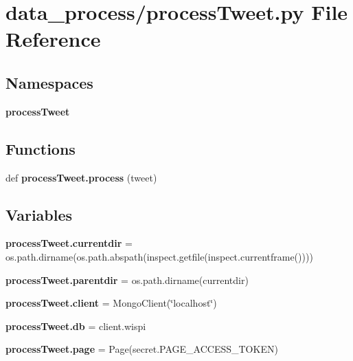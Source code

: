 \section{data\+\_\+process/process\+Tweet.py File Reference}
\label{process_tweet_8py}
\subsection*{Namespaces}
\begin{DoxyCompactItemize}
\item 
 {\bf process\+Tweet}
\end{DoxyCompactItemize}
\subsection*{Functions}
\begin{DoxyCompactItemize}
\item 
def {\bf process\+Tweet.\+process} (tweet)
\end{DoxyCompactItemize}
\subsection*{Variables}
\begin{DoxyCompactItemize}
\item 
{\bf process\+Tweet.\+currentdir} = os.\+path.\+dirname(os.\+path.\+abspath(inspect.\+getfile(inspect.\+currentframe())))
\item 
{\bf process\+Tweet.\+parentdir} = os.\+path.\+dirname(currentdir)
\item 
{\bf process\+Tweet.\+client} = Mongo\+Client(\char`\"{}localhost\char`\"{})
\item 
{\bf process\+Tweet.\+db} = client.\+wispi
\item 
{\bf process\+Tweet.\+page} = Page(secret.\+P\+A\+G\+E\+\_\+\+A\+C\+C\+E\+S\+S\+\_\+\+T\+O\+K\+EN)
\end{DoxyCompactItemize}
